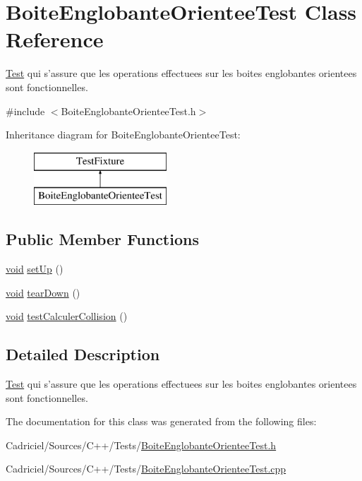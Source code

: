 \hypertarget{class_boite_englobante_orientee_test}{\section{Boite\-Englobante\-Orientee\-Test Class Reference}
\label{class_boite_englobante_orientee_test}
}


\hyperlink{class_test}{Test} qui s'assure que les operations effectuees sur les boites englobantes orientees sont fonctionnelles.  




{\ttfamily \#include $<$Boite\-Englobante\-Orientee\-Test.\-h$>$}

Inheritance diagram for Boite\-Englobante\-Orientee\-Test\-:\begin{figure}[H]
\begin{center}
\leavevmode
\includegraphics[height=2.000000cm]{class_boite_englobante_orientee_test}
\end{center}
\end{figure}
\subsection*{Public Member Functions}
\begin{DoxyCompactItemize}
\item 
\hyperlink{wglew_8h_aeea6e3dfae3acf232096f57d2d57f084}{void} \hyperlink{group__inf2990_ga3834ff95e970fc8a6fa9dc257c29a389}{set\-Up} ()
\item 
\hyperlink{wglew_8h_aeea6e3dfae3acf232096f57d2d57f084}{void} \hyperlink{group__inf2990_ga139b16d99327e493e0711b802b882832}{tear\-Down} ()
\item 
\hyperlink{wglew_8h_aeea6e3dfae3acf232096f57d2d57f084}{void} \hyperlink{group__inf2990_gaf90ec830d73ad669f126faf67f9139e8}{test\-Calculer\-Collision} ()
\end{DoxyCompactItemize}


\subsection{Detailed Description}
\hyperlink{class_test}{Test} qui s'assure que les operations effectuees sur les boites englobantes orientees sont fonctionnelles. 

The documentation for this class was generated from the following files\-:\begin{DoxyCompactItemize}
\item 
Cadriciel/\-Sources/\-C++/\-Tests/\hyperlink{_boite_englobante_orientee_test_8h}{Boite\-Englobante\-Orientee\-Test.\-h}\item 
Cadriciel/\-Sources/\-C++/\-Tests/\hyperlink{_boite_englobante_orientee_test_8cpp}{Boite\-Englobante\-Orientee\-Test.\-cpp}\end{DoxyCompactItemize}
